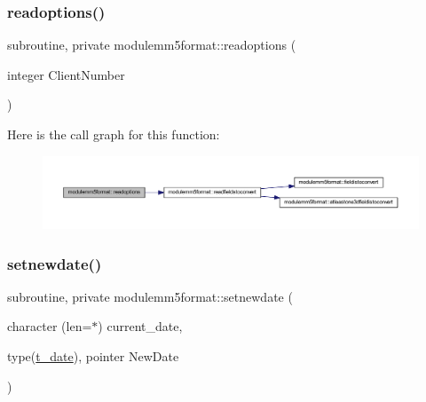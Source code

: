 \subsubsection{\texorpdfstring{readoptions()}{readoptions()}}
{\footnotesize\ttfamily subroutine, private modulemm5format\+::readoptions (\begin{DoxyParamCaption}\item[{integer}]{Client\+Number }\end{DoxyParamCaption})\hspace{0.3cm}{\ttfamily [private]}}

Here is the call graph for this function\+:\nopagebreak
\begin{figure}[H]
\begin{center}
\leavevmode
\includegraphics[width=350pt]{namespacemodulemm5format_a97e9dde30f26c338513668851aff53f5_cgraph}
\end{center}
\end{figure}
\mbox{\label{namespacemodulemm5format_a87a63ca9f90961d4aa43cc6653ea5083}} 
\subsubsection{\texorpdfstring{setnewdate()}{setnewdate()}}
{\footnotesize\ttfamily subroutine, private modulemm5format\+::setnewdate (\begin{DoxyParamCaption}\item[{character (len=$\ast$)}]{current\+\_\+date,  }\item[{type(\mbox{\hyperlink{structmodulemm5format_1_1t__date}{t\+\_\+date}}), pointer}]{New\+Date }\end{DoxyParamCaption})\hspace{0.3cm}{\ttfamily [private]}}

